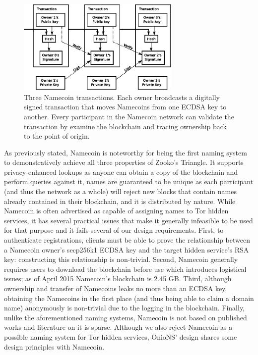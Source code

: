 \begin{figure}[htbp]
	\centering
	\includegraphics[width=0.7\textwidth]{images/Namecoin/bitcoin_transaction.eps}
	\caption{Three Namecoin transactions. Each owner broadcasts a digitally signed transaction that moves Namecoins from one ECDSA key to another. Every participant in the Namecoin network can validate the transaction by examine the blockchain and tracing ownership back to the point of origin.}
	\label{fig:NamecoinTransaction}
\end{figure}

As previously stated, Namecoin is noteworthy for being the first naming system to demonstratively achieve all three properties of Zooko's Triangle. It supports privacy-enhanced lookups as anyone can obtain a copy of the blockchain and perform queries against it, names are guaranteed to be unique as each participant (and thus the network as a whole) will reject new blocks that contain names already contained in their blockchain, and it is distributed by nature. While Namecoin is often advertised as capable of assigning names to Tor hidden services, it has several practical issues that make it generally infeasible to be used for that purpose and it fails several of our design requirements. First, to authenticate registrations, clients must be able to prove the relationship between a Namecoin owner's secp256k1 ECDSA key and the target hidden service's RSA key: constructing this relationship is non-trivial. Second, Namecoin generally requires users to download the blockchain before use which introduces logistical issues; as of April 2015 Namecoin's blockchain is 2.45 GB.\cite{BitInfoCharts} Third, although ownership and transfer of Namecoins leaks no more than an ECDSA key, obtaining the Namecoins in the first place (and thus being able to claim a domain name) anonymously is non-trivial due to the logging in the blockchain. Finally, unlike the aforementioned naming systems, Namecoin is not based on published works and literature on it is sparse. Although we also reject Namecoin as a possible naming system for Tor hidden services, OnioNS' design shares some design principles with Namecoin.
